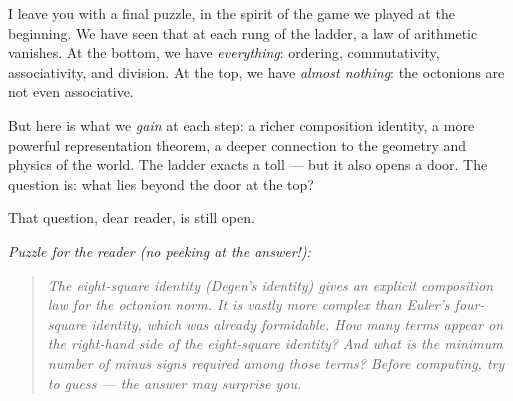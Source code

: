 I leave you with a final puzzle, in the spirit of the game we played at the beginning. We have seen that at each rung of the ladder, a law of arithmetic vanishes. At the bottom, we have \emph{everything}: ordering, commutativity, associativity, and division. At the top, we have \emph{almost nothing}: the octonions are not even associative.

But here is what we \emph{gain} at each step: a richer composition identity, a more powerful representation theorem, a deeper connection to the geometry and physics of the world. The ladder exacts a toll --- but it also opens a door. The question is: what lies beyond the door at the top?

That question, dear reader, is still open.



\emph{Puzzle for the reader (no peeking at the answer!):}

\begin{quote}
\emph{The eight-square identity (Degen's identity) gives an explicit composition law for the octonion norm. It is vastly more complex than Euler's four-square identity, which was already formidable. How many terms appear on the right-hand side of the eight-square identity? And what is the minimum number of minus signs required among those terms? Before computing, try to guess --- the answer may surprise you.}
\end{quote}
